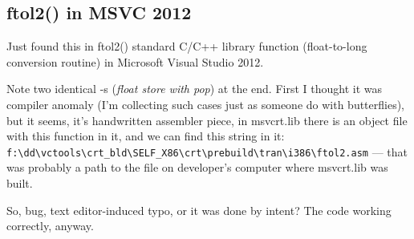 \subsection{ftol2() in MSVC 2012}

Just found this in ftol2() standard C/C++ library function (float-to-long conversion routine) in Microsoft Visual Studio 2012.



Note two identical -s (\emph{float store with pop}) at the end. 
First I thought it was compiler anomaly (I'm collecting such cases just as someone do with butterflies),
but it seems, it's handwritten assembler piece, in msvcrt.lib there is an object file with this function in it,
and we can find this string in it:\\
\verb|f:\dd\vctools\crt_bld\SELF_X86\crt\prebuild\tran\i386\ftol2.asm| ---
that was probably a path to the file on developer's computer where msvcrt.lib was built.

So, bug, text editor-induced typo, or it was done by intent?
The code working correctly, anyway.

